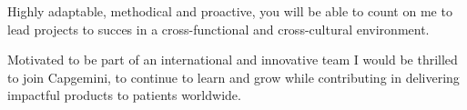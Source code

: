 \documentclass[11pt, a4paper]{awesome-cv}
\begin{document}
\begin{cvletter}
Highly adaptable, methodical and proactive, you will be able to count on me to lead projects to succes in a cross-functional and cross-cultural environment.

Motivated to be part of an international and innovative team I would be thrilled to join Capgemini, to continue to learn and grow while contributing in delivering impactful products to patients worldwide.

\end{cvletter}

\makeletterclosing
\end{document}
